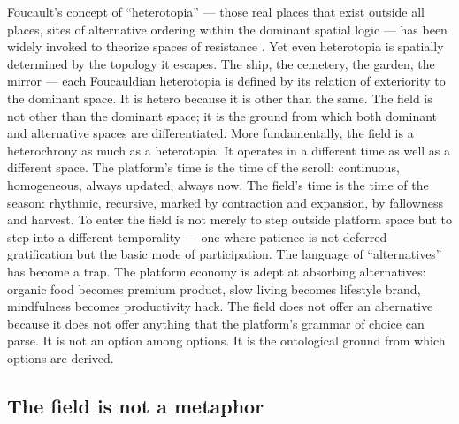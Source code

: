 Foucault's concept of ``heterotopia'' --- those real places that exist outside all places, sites of alternative ordering within the dominant spatial logic --- has been widely invoked to theorize spaces of resistance \cite{foucault_1984}. Yet even heterotopia is spatially determined by the topology it escapes. The ship, the cemetery, the garden, the mirror — each Foucauldian heterotopia is defined by its relation of exteriority to the dominant space. It is hetero because it is other than the same. The field is not other than the dominant space; it is the ground from which both dominant and alternative spaces are differentiated. More fundamentally, the field is a heterochrony as much as a heterotopia. It operates in a different time as well as a different space. The platform’s time is the time of the scroll: continuous, homogeneous, always updated, always now. The field’s time is the time of the season: rhythmic, recursive, marked by contraction and expansion, by fallowness and harvest. To enter the field is not merely to step outside platform space but to step into a different temporality — one where patience is not deferred gratification but the basic mode of participation. The language of “alternatives” has become a trap. The platform economy is adept at absorbing alternatives: organic food becomes premium product, slow living becomes lifestyle brand, mindfulness becomes productivity hack. The field does not offer an alternative because it does not offer anything that the platform’s grammar of choice can parse. It is not an option among options. It is the ontological ground from which options are derived.

\subsection{The field is not a metaphor}


